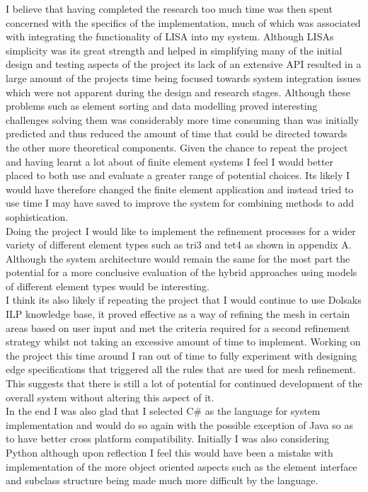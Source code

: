 \noindent
I believe that having completed the research too much time was then spent concerned with the specifics of the implementation, much of which was associated with integrating the functionality of LISA into my system. Although LISAs simplicity was its great strength and helped in simplifying many of the initial design and testing aspects of the project its lack of an extensive API resulted in a large amount of the projects time being focused towards system integration issues which were not apparent during the design and research stages. Although these problems such as element sorting and data modelling proved interesting challenges solving them was considerably more time consuming than was initially predicted and thus reduced the amount of time that could be directed towards the other more theoretical components. Given the chance to repeat the project and having learnt a lot about of finite element systems I feel I would better placed to both use and evaluate a greater range of potential choices. Its likely I would have therefore changed the finite element application and instead tried to use time I may have saved to improve the system for combining methods to add sophistication. \\ 

\noindent
Doing the project I would like to implement the refinement processes for a wider variety of different element types such as tri3 and tet4 as shown in appendix A. Although the system architecture would remain the same for the most part the potential for a more conclusive evaluation of the hybrid approaches using models of different element types would be interesting. \\ 

\noindent
I think its also likely if repeating the project that I would continue to use Dolsaks ILP knowledge base, it proved effective as a way of refining the mesh in certain areas based on user input and met the criteria required for a second refinement strategy whilst not taking an excessive amount of time to implement. Working on the project this time around I ran out of time to fully experiment with designing edge specifications that triggered all the rules that are used for mesh refinement. This suggests that there is still a lot of potential for continued development of the overall system without altering this aspect of it. \\ 

\noindent
In the end I was also glad that I selected C\# as the language for system implementation and would do so again with the possible exception of Java so as to have better cross platform compatibility. Initially I was also considering  Python although upon reflection I feel this would have been a mistake with implementation of the more object oriented aspects such as the element interface and subclass structure being made much more difficult by the language.



